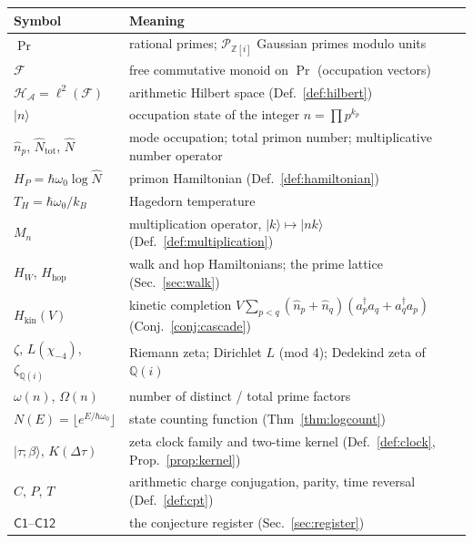 \documentclass[11pt,a4paper]{article}
\theoremstyle{plain}
\theoremstyle{definition}
\theoremstyle{remark}
\newcommand{\ket}[1]{\lvert #1\rangle}
\newcommand{\Zz}{\mathbb{Z}}
\newcommand{\Qq}{\mathbb{Q}}
\newcommand{\Hil}{\mathcal{H}}
\newcommand{\Nhat}{\widehat{N}}
\begin{document}
\begin{center}
\begin{tabular}{@{}ll@{}}
\toprule
Symbol & Meaning\\
\midrule
$\Pr$ & rational primes; $\mathcal{P}_{\Zz[i]}$ Gaussian primes modulo units\\
$\mathcal{F}$ & free commutative monoid on $\Pr$ (occupation vectors)\\
$\Hil_{\mathcal{A}}=\ell^{2}(\mathcal{F})$ & arithmetic Hilbert space (Def.~\ref{def:hilbert})\\
$\ket{n}$ & occupation state of the integer $n=\prod p^{k_{p}}$\\
$\hat n_{p}$, $\Nhat_{\mathrm{tot}}$, $\Nhat$ & mode occupation; total primon number; multiplicative number operator\\
$H_{P}=\hbar\omega_{0}\log\Nhat$ & primon Hamiltonian (Def.~\ref{def:hamiltonian})\\
$T_{H}=\hbar\omega_{0}/k_{B}$ & Hagedorn temperature\\
$M_{n}$ & multiplication operator, $\ket{k}\mapsto\ket{nk}$ (Def.~\ref{def:multiplication})\\
$H_{W}$, $H_{\mathrm{hop}}$ & walk and hop Hamiltonians; the prime lattice
(Sec.~\ref{sec:walk})\\
$H_{\mathrm{kin}}(V)$ & kinetic completion $V\sum_{p<q}(\hat n_{p}+\hat n_{q})
(a_{p}^{\dagger}a_{q}+a_{q}^{\dagger}a_{p})$ (Conj.~\ref{conj:cascade})\\
$\zeta$, $L(\chi_{-4})$, $\zeta_{\Qq(i)}$ & Riemann zeta; Dirichlet $L$ (mod 4); Dedekind zeta of $\Qq(i)$\\
$\omega(n)$, $\Omega(n)$ & number of distinct / total prime factors\\
$N(E)=\lfloor e^{E/\hbar\omega_{0}}\rfloor$ & state counting function (Thm~\ref{thm:logcount})\\
$\ket{\tau;\beta}$, $K(\Delta\tau)$ & zeta clock family and two-time kernel
(Def.~\ref{def:clock}, Prop.~\ref{prop:kernel})\\
$C$, $P$, $T$ & arithmetic charge conjugation, parity, time reversal
(Def.~\ref{def:cpt})\\
$\mathsf{C1}$--$\mathsf{C12}$ & the conjecture register (Sec.~\ref{sec:register})\\
\bottomrule
\end{tabular}
\end{center}
\end{document}
